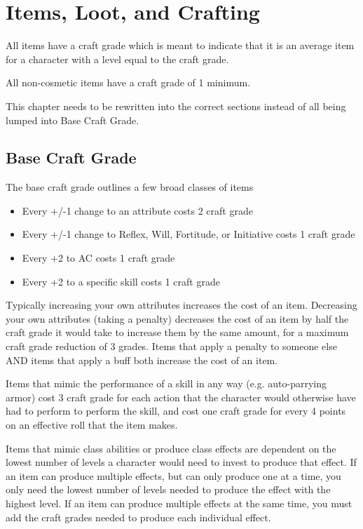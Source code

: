 \chapter{Items, Loot, and Crafting}

All items have a craft grade which is meant to indicate that it is an average item for a character with a level equal to the craft grade.

All non-cosmetic items have a craft grade of 1 minimum.

This chapter needs to be rewritten into the correct sections instead of all being lumped into Base Craft Grade.

\section{Base Craft Grade}
The base craft grade outlines a few broad classes of items

\begin{itemize}
	\item Every +/-1 change to an attribute costs 2 craft grade
	\item Every +/-1 change to Reflex, Will, Fortitude, or Initiative costs 1 craft grade
	\item Every +2 to AC costs 1 craft grade
	\item Every +2 to a specific skill costs 1 craft grade
	
\end{itemize}

Typically increasing your own attributes increases the cost of an item. Decreasing your own attributes (taking a penalty) decreases the cost of an item by half the craft grade it would take to increase them by the same amount, for a maximum craft grade reduction of 3 grades. Items that apply a penalty to someone else AND items that apply a buff both increase the cost of an item.

Items that mimic the performance of a skill in any way (e.g. auto-parrying armor) cost 3 craft grade for each action that the character would otherwise have had to perform to perform the skill, and cost one craft grade for every 4 points on an effective roll that the item makes.

Items that mimic class abilities or produce class effects are dependent on the lowest number of levels a character would need to invest to produce that effect. If an item can produce multiple effects, but can only produce one at a time, you only need the lowest number of levels needed to produce the effect with the highest level. If an item can produce multiple effects at the same time, you must add the craft grades needed to produce each individual effect.

